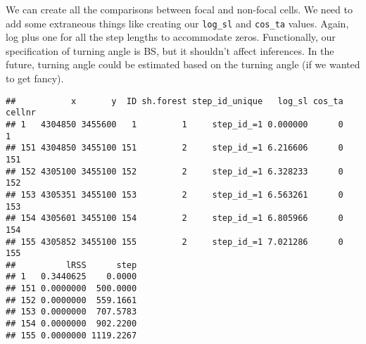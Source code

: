 \documentclass[
]{article}
\newenvironment{Shaded}{\begin{snugshade}}{\end{snugshade}}
\newcommand{\AttributeTok}[1]{\textcolor[rgb]{0.77,0.63,0.00}{#1}}
\newcommand{\ControlFlowTok}[1]{\textcolor[rgb]{0.13,0.29,0.53}{\textbf{#1}}}
\newcommand{\DecValTok}[1]{\textcolor[rgb]{0.00,0.00,0.81}{#1}}
\newcommand{\FunctionTok}[1]{\textcolor[rgb]{0.00,0.00,0.00}{#1}}
\newcommand{\NormalTok}[1]{#1}
\newcommand{\OtherTok}[1]{\textcolor[rgb]{0.56,0.35,0.01}{#1}}
\newcommand{\SpecialCharTok}[1]{\textcolor[rgb]{0.00,0.00,0.00}{#1}}
\newcommand{\StringTok}[1]{\textcolor[rgb]{0.31,0.60,0.02}{#1}}
\begin{document}
We can create all the comparisons between focal and non-focal cells. We
need to add some extraneous things like creating our \texttt{log\_sl}
and \texttt{cos\_ta} values. Again, log plus one for all the step
lengths to accommodate zeros. Functionally, our specification of turning
angle is BS, but it shouldn't affect inferences. In the future, turning
angle could be estimated based on the turning angle (if we wanted to get
fancy).

\begin{Shaded}
\end{Shaded}

\begin{verbatim}
##           x       y  ID sh.forest step_id_unique   log_sl cos_ta cellnr
## 1   4304850 3455600   1         1     step_id_=1 0.000000      0      1
## 151 4304850 3455100 151         2     step_id_=1 6.216606      0    151
## 152 4305100 3455100 152         2     step_id_=1 6.328233      0    152
## 153 4305351 3455100 153         2     step_id_=1 6.563261      0    153
## 154 4305601 3455100 154         2     step_id_=1 6.805966      0    154
## 155 4305852 3455100 155         2     step_id_=1 7.021286      0    155
##          lRSS      step
## 1   0.3440625    0.0000
## 151 0.0000000  500.0000
## 152 0.0000000  559.1661
## 153 0.0000000  707.5783
## 154 0.0000000  902.2200
## 155 0.0000000 1119.2267
\end{verbatim}
\end{document}
